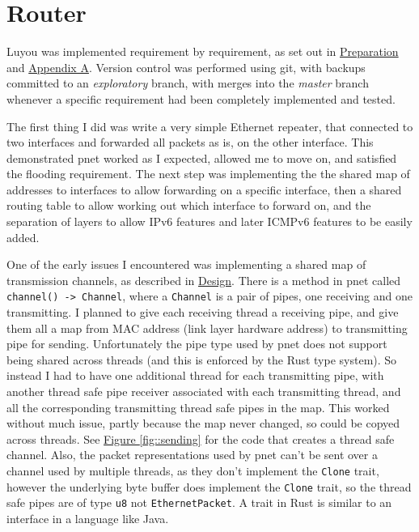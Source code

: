 \documentclass[12pt,a4paper,twoside,openright]{report}
\begin{document}
\section{Router}
\label{sec::router}

Luyou was implemented requirement by requirement, as set out in \hyperref[chap::preparation]{Preparation} and \hyperref[appendix::requirements]{Appendix A}.  Version control was performed using git\cite{git}, with backups committed to an \textit{exploratory} branch, with merges into the \textit{master} branch whenever a specific requirement had been completely implemented and tested.

\bigskip

The first thing I did was write a very simple Ethernet repeater, that connected to two interfaces and forwarded all packets as is, on the other interface.  This demonstrated pnet\cite{pnet_rust} worked as I expected, allowed me to move on, and satisfied the flooding requirement.  The next step was implementing the the shared map of addresses to interfaces to allow forwarding on a specific interface, then a shared routing table to allow working out which interface to forward on, and the separation of layers to allow IPv6 features and later ICMPv6 features to be easily added.

\bigskip

One of the early issues I encountered was implementing a shared map of transmission channels, as described in \hyperref[sec::design]{Design}. There is a method in pnet\cite{pnet_rust} called \verb!channel() -> Channel!, where a \verb!Channel! is a pair of pipes, one receiving and one transmitting.  I planned to give each receiving thread a receiving pipe, and give them all a map from MAC address  (link layer hardware address) to transmitting pipe for sending.  Unfortunately the pipe type used by pnet does not support being shared across threads (and this is enforced by the Rust type system). So instead I had to have one additional thread for each transmitting pipe, with another thread safe pipe receiver associated with each transmitting thread, and all the corresponding transmitting thread safe pipes in the map.  This worked without much issue, partly because the map never changed, so could be copyed across threads.  See \hyperref[fig::sending]{Figure }\ref{fig::sending} for the code that creates a thread safe channel. Also, the packet representations used by pnet can't be sent over a channel used by multiple threads, as they don't implement the \verb!Clone! trait, however the underlying byte buffer does implement the \verb!Clone! trait, so the thread safe pipes are of type \verb!u8! not \verb!EthernetPacket!. A trait in Rust is similar to an interface in a language like Java.
\end{document}

